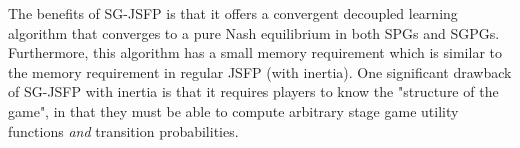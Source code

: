 The benefits of SG-JSFP is that it offers a convergent decoupled learning algorithm that converges to a pure Nash equilibrium in both SPGs and SGPGs. Furthermore, this algorithm has a small memory requirement which is similar to the memory requirement in regular JSFP (with inertia). One significant drawback of SG-JSFP with inertia is that it requires players to know the "structure of the game", in that they must be able to compute arbitrary stage game utility functions {\em and} transition probabilities. 













